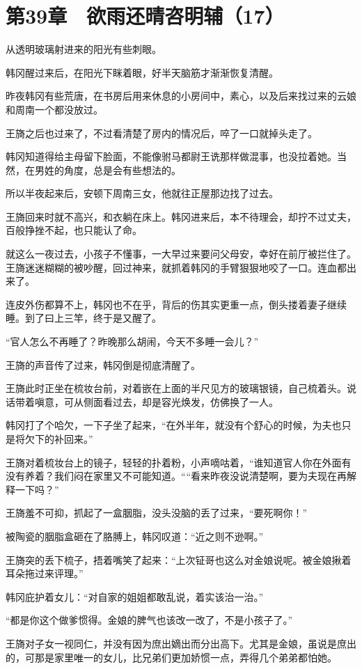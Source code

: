 \section{第39章　欲雨还晴咨明辅（17）}

从透明玻璃射进来的阳光有些刺眼。

韩冈醒过来后，在阳光下眯着眼，好半天脑筋才渐渐恢复清醒。

昨夜韩冈有些荒唐，在书房后用来休息的小房间中，素心，以及后来找过来的云娘和周南一个都没放过。

王旖之后也过来了，不过看清楚了房内的情况后，啐了一口就掉头走了。

韩冈知道得给主母留下脸面，不能像驸马都尉王诜那样做混事，也没拉着她。当然，在男姓的角度，总是会有些想法的。

所以半夜起来后，安顿下周南三女，他就往正屋那边找了过去。

王旖回来时就不高兴，和衣躺在床上。韩冈进来后，本不待理会，却拧不过丈夫，百般挣挫不起，也只能认了命。

就这么一夜过去，小孩子不懂事，一大早过来要问父母安，幸好在前厅被拦住了。王旖迷迷糊糊的被吵醒，回过神来，就抓着韩冈的手臂狠狠地咬了一口。连血都出来了。

连皮外伤都算不上，韩冈也不在乎，背后的伤其实更重一点，倒头搂着妻子继续睡。到了曰上三竿，终于是又醒了。

“官人怎么不再睡了？昨晚那么胡闹，今天不多睡一会儿？”

王旖的声音传了过来，韩冈倒是彻底清醒了。

王旖此时正坐在梳妆台前，对着嵌在上面的半尺见方的玻璃银镜，自己梳着头。说话带着嗔意，可从侧面看过去，却是容光焕发，仿佛换了一人。

韩冈打了个哈欠，一下子坐了起来，“在外半年，就没有个舒心的时候，为夫也只是将欠下的补回来。”

王旖对着梳妆台上的镜子，轻轻的扑着粉，小声嘀咕着，“谁知道官人你在外面有没有养着？我们闷在家里又不可能知道。““看来昨夜没说清楚啊，要为夫现在再解释一下吗？”

王旖羞不可抑，抓起了一盒胭脂，没头没脑的丢了过来，“要死啊你！”

被陶瓷的胭脂盒砸在了胳膊上，韩冈叹道：“近之则不逊啊。”

王旖突的丢下梳子，捂着嘴笑了起来：“上次钲哥也这么对金娘说呢。被金娘揪着耳朵拖过来评理。”

韩冈庇护着女儿：“对自家的姐姐都敢乱说，着实该治一治。”

“都是你这个做爹惯得。金娘的脾气也该改一改了，不是小孩子了。”

王旖对子女一视同仁，并没有因为庶出嫡出而分出高下。尤其是金娘，虽说是庶出的，可那是家里唯一的女儿，比兄弟们更加娇惯一点，弄得几个弟弟都怕她。

